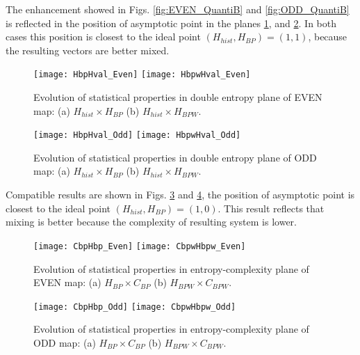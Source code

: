 The enhancement showed in Figs. \ref{fig:EVEN_QuantiB} and \ref{fig:ODD_QuantiB} is reflected in the position of asymptotic point in the planes \ref{fig:EVEN_HH}, and \ref{fig:ODD_HH}.
In both cases this position is closest to the ideal point $(H_{hist}, H_{BP})=(1, 1)$, because the resulting vectors are better mixed.

\begin{figure}
	\texttt{[image: HbpHval\_Even]}
	\texttt{[image: HbpwHval\_Even]}
	\caption{Evolution of statistical properties in double entropy plane of EVEN map: (a) $H_{hist} \times H_{BP}$ (b) $H_{hist} \times H_{BPW}$.}
	\label{fig:EVEN_HH}
\end{figure}

\begin{figure}
	\texttt{[image: HbpHval\_Odd]}
	\texttt{[image: HbpwHval\_Odd]}
	\caption{Evolution of statistical properties in double entropy plane of ODD map: (a) $H_{hist} \times H_{BP}$ (b) $H_{hist} \times H_{BPW}$.}
	\label{fig:ODD_HH}
\end{figure}

Compatible results are shown in Figs. \ref{fig:EVEN_HC} and \ref{fig:ODD_HC}, the position of asymptotic point is closest to the ideal point $(H_{hist}, H_{BP})=(1, 0)$.
This result reflects that mixing is better because the complexity of resulting system is lower.

\begin{figure}
	\texttt{[image: CbpHbp\_Even]}
	\texttt{[image: CbpwHbpw\_Even]}
	\caption{Evolution of statistical properties in entropy-complexity plane of EVEN map: (a) $H_{BP} \times C_{BP}$ (b) $H_{BPW} \times C_{BPW}$.}
	\label{fig:EVEN_HC}
\end{figure}

\begin{figure}
	\texttt{[image: CbpHbp\_Odd]}
	\texttt{[image: CbpwHbpw\_Odd]}
	\caption{Evolution of statistical properties in entropy-complexity plane of ODD map: (a) $H_{BP} \times C_{BP}$ (b) $H_{BPW} \times C_{BPW}$.}
	\label{fig:ODD_HC}
\end{figure}